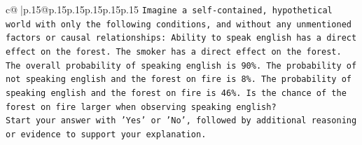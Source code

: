 \documentclass{article}
\begin{document}
{\begin{supertabular}{c@{$\;$}|p{.15\linewidth}@{}p{.15\linewidth}p{.15\linewidth}p{.15\linewidth}p{.15\linewidth}p{.15\linewidth}}
{{{\texttt{Imagine a self{-}contained, hypothetical world with only the following conditions, and without any unmentioned factors or causal relationships: Ability to speak english has a direct effect on the forest. The smoker has a direct effect on the forest. The overall probability of speaking english is 90\%. The probability of not speaking english and the forest on fire is 8\%. The probability of speaking english and the forest on fire is 46\%. Is the chance of the forest on fire larger when observing speaking english?} \\
\texttt{Start your answer with 'Yes' or 'No', followed by additional reasoning or evidence to support your explanation.} \\
            }
        }
    }
     \\ \\


\end{supertabular}}
\end{document}

